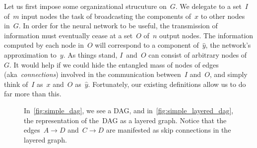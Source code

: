\documentclass[11pt,a4paper]{article}
\numberwithin{equation}{section}
\begin{document}
Let us first impose some organizational strucuture on~$G$. We delegate to a
set~$I$ of~$m$ input nodes the task of broadcasting the components of~$x$ to
other nodes in~$G$. In order for the neural network to be useful, the
transmission of information must eventually cease at a set~$O$ of~$n$ output
nodes. The information computed by each node in~$O$ will correspond to a
component of~$\hat{y}$, the network's approximation to~$y$. As things stand,
$I$~and~$O$ can consist of arbitrary nodes of~$G$. It would help if we could
hide the entangled mass of nodes of edges (aka~\emph{connections}) involved in
the communication between~$I$ and~$O$, and simply think of~$I$ as~$x$ and~$O$
as~$\hat{y}$.  Fortunately, our existing definitions allow us to do far more
than this.

\begin{figure}
\centering
\begin{minipage}[t]{0.4\linewidth}
	\centering
	\subcaption{}\label{fig:simple_dag}
\end{minipage}
\begin{minipage}[t]{0.4\linewidth}
	\centering
	\subcaption{}\label{fig:simple_layered_dag}
\end{minipage}
\caption{In~\ref{fig:simple_dag}, we see a DAG, and
in~\ref{fig:simple_layered_dag}, the representation of the~DAG as a layered
graph. Notice that the edges~$A \rightarrow D$ and~$C \rightarrow D$ are
manifested as skip connections in the layered
graph.\label{fig:layered_graph_drawing}}
\end{figure}
\end{document}
